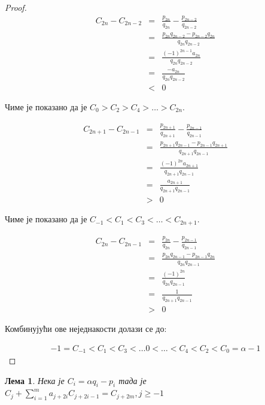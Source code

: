 \documentclass[a4paper]{article}
\newtheorem{lemma}{Лема}
\begin{document}
\begin{proof}
	
	\begin{eqnarray*}
		C_{2n} - C_{2n-2} &=& \frac{p_{2n}}{q_{2n}} - \frac{p_{2n-2}}{q_{2n-2}}\\
						  &=& \frac{p_{2n}q_{2n-2} - p_{2n-2}q_{2n}}{q_{2n}q_{2n-2}}\\
						  &=& \frac{(-1)^{2n-1}a_{2n}}{q_{2n}q_{2n-2}}\\
						  &=& \frac{-a_{2n}}{q_{2n}q_{2n-2}}\\
						  &<& 0
	\end{eqnarray*}

	Чиме је показано да је $ C_{0} > C_{2} > C_{4} > \ldots > C_{2n} $. 

	\begin{eqnarray*}
		C_{2n+1} - C_{2n-1} &=& \frac{p_{2n+1}}{q_{2n+1}} - \frac{p_{2n-1}}{q_{2n-1}}\\
		&=& \frac{p_{2n+1}q_{2n-1} - p_{2n-1}q_{2n+1}}{q_{2n+1}q_{2n-1}}\\
		&=& \frac{(-1)^{2n}a_{2n+1}}{q_{2n+1}q_{2n-1}}\\
		&=& \frac{a_{2n+1}}{q_{2n+1}q_{2n-1}}\\
		&>& 0
	\end{eqnarray*}
	
	Чиме је показано да је $ C_{-1} < C_{1} < C_{3} < \ldots < C_{2n+1} $.
	
	\begin{eqnarray*}
		C_{2n} - C_{2n-1} &=& \frac{p_{2n}}{q_{2n}} - \frac{p_{2n-1}}{q_{2n-1}}\\
		&=& \frac{p_{2n}q_{2n-1} - p_{2n-1}q_{2n}}{q_{2n}q_{2n-1}}\\
		&=& \frac{(-1)^{2n}}{q_{2n}q_{2n-1}}\\
		&=& \frac{1}{q_{2n+1}q_{2n-1}}\\
		&>& 0
	\end{eqnarray*}


	Комбинујући ове неједнакости долази се до:
	
	\begin{eqnarray*}
		-1 = C_{-1} < C_{1} < C_{3} < \ldots 0 < \ldots < C_{4} < C_{2} < C_{0} = \alpha - 1
	\end{eqnarray*}
	
\end{proof}

\begin{lemma}
	\label{lemma:svojstva_konvergenata_2}
	Нека је $ C_{i} = \alpha q_{i} - p_{i} $ тада је $ C_{j} + \sum_{i=1}^{m} a_{j+2i}C_{j+2i-1} = C_{j+2m}, j \geq -1 $
\end{lemma}
\end{document}
